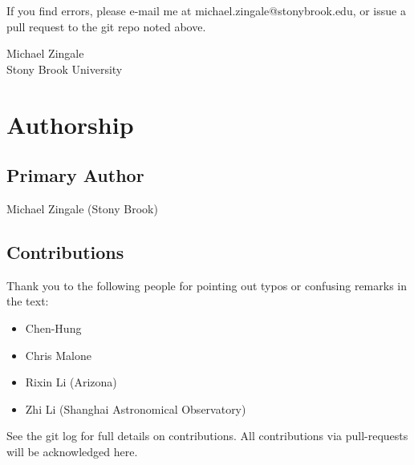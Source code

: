 If you find errors, please e-mail me at michael.zingale@stonybrook.edu,
or issue a pull request to the git repo noted above.  



\begin{flushright}
Michael Zingale \\
Stony Brook University
\end{flushright}

\clearpage



\clearpage

\section*{Authorship}

\subsection*{Primary Author}

Michael Zingale (Stony Brook)


\subsection*{Contributions}

Thank you to the
following people for pointing out typos or confusing remarks in the text:
\begin{itemize}
\item Chen-Hung
\item Chris Malone 
\item Rixin Li (Arizona)
\item Zhi Li (Shanghai Astronomical Observatory)
\end{itemize}

See the git log for full details on contributions.  All contributions
via pull-requests will be acknowledged here.
